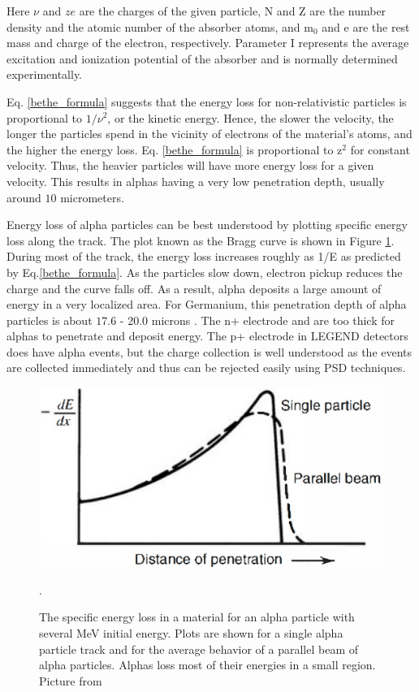 Here $\nu$ and $ze$ are the charges of the given particle, N and Z are the number density and the atomic number of the absorber atoms, and  m$_0$ and e are the rest mass and charge of the electron, respectively. Parameter I represents the average excitation and ionization potential of the absorber and is normally determined experimentally. 

Eq. \ref{bethe_formula} suggests that the energy loss for non-relativistic particles is proportional to $1/\nu^2$, or the kinetic energy. Hence, the slower the velocity, the longer the particles spend in the vicinity of electrons of the material's atoms, and the higher the energy loss. Eq. \ref{bethe_formula} is proportional to z$^2$ for constant velocity. Thus, the heavier particles will have more energy loss for a given velocity. This results in alphas having a very low penetration depth, usually around $10$ micrometers.

Energy loss of alpha particles can be best understood by plotting specific energy loss along the track. The plot known as the Bragg curve is shown in Figure \ref{bragg_curve_fig}. During most of the track, the energy loss increases roughly as 1/E as predicted by Eq.\ref{bethe_formula}. As the particles slow down, electron pickup reduces the charge and the curve falls off. As a result, alpha deposits a large amount of energy in a very localized area. For Germanium, this penetration depth of alpha particles is about $17.6$ - $20.0$ microns \cite{knoll_2010}. The n+ electrode and  are too thick for alphas to penetrate and deposit energy. The p+ electrode in LEGEND detectors does have alpha events, but the charge collection is well understood as the events are collected immediately and thus can be rejected easily using PSD techniques. 

\begin{figure}
\centering
\includegraphics[width=0.5\linewidth]{ch3/figs/bragg_curve.png}
\caption{The specific energy loss in a material for an alpha particle with several MeV initial energy. Plots are shown for a single alpha particle track and for the average behavior of a parallel beam of alpha particles. Alphas loss most of their energies in a small region. Picture from \cite{knoll_2010}}. 
\label{bragg_curve_fig}
\end{figure}

